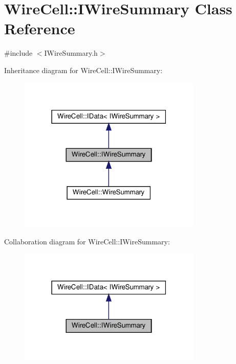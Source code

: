 \hypertarget{class_wire_cell_1_1_i_wire_summary}{}\section{Wire\+Cell\+:\+:I\+Wire\+Summary Class Reference}
\label{class_wire_cell_1_1_i_wire_summary}


{\ttfamily \#include $<$I\+Wire\+Summary.\+h$>$}



Inheritance diagram for Wire\+Cell\+:\+:I\+Wire\+Summary\+:
\nopagebreak
\begin{figure}[H]
\begin{center}
\leavevmode
\includegraphics[width=247pt]{class_wire_cell_1_1_i_wire_summary__inherit__graph}
\end{center}
\end{figure}


Collaboration diagram for Wire\+Cell\+:\+:I\+Wire\+Summary\+:
\nopagebreak
\begin{figure}[H]
\begin{center}
\leavevmode
\includegraphics[width=247pt]{class_wire_cell_1_1_i_wire_summary__coll__graph}
\end{center}
\end{figure}
